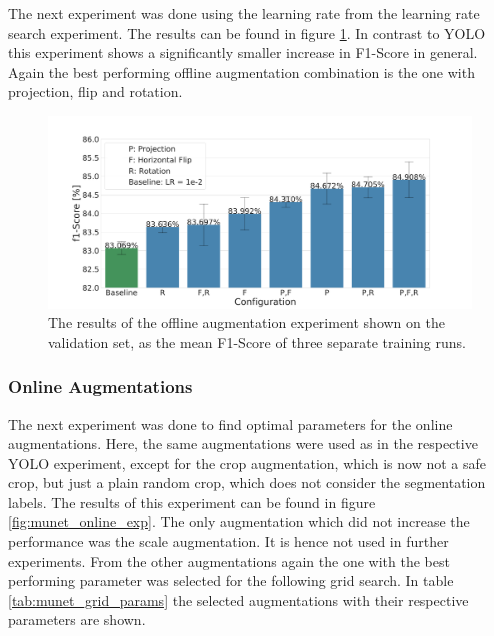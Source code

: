 The next experiment was done using the learning rate from the learning rate search experiment.
The results can be found in figure \ref{fig:munet_offline_exp}.
In contrast to YOLO this experiment shows a significantly smaller increase in F1-Score in general.
Again the best performing offline augmentation combination is the one with projection, flip and rotation.

\begin{figure}[t!]
\begin{center}
    \includegraphics[width=13cm]{imgs/munet_offline_aug_experiment.pdf}
    \caption{The results of the offline augmentation experiment shown on the validation set, as the mean F1-Score of three separate training runs.}
    \label{fig:munet_offline_exp}
\end{center}
\end{figure}

\subsubsection{Online Augmentations}

The next experiment was done to find optimal parameters for the online augmentations.
Here, the same augmentations were used as in the respective YOLO experiment, except for the crop augmentation, which is now not a safe crop, but just a plain random crop, which does not consider the segmentation labels.
The results of this experiment can be found in figure \ref{fig:munet_online_exp}.
The only augmentation which did not increase the performance was the scale augmentation.
It is hence not used in further experiments.
From the other augmentations again the one with the best performing parameter was selected for the following grid search.
In table \ref{tab:munet_grid_params} the selected augmentations with their respective parameters are shown.

